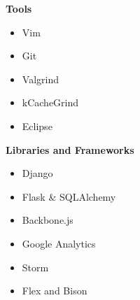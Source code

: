 \documentclass[overlapped]{res}
\begin{document}
\begin{resume}
\begin{multicols}{3}
        \textbf{Tools}
        \begin{itemize}
            \item Vim
            \item Git
            \item Valgrind
            \item kCacheGrind
            \item Eclipse
        \end{itemize}
        \columnbreak

        \textbf{Libraries and Frameworks}
        \begin{itemize}
            \item Django
            \item Flask \& SQLAlchemy
            \item Backbone.js
            \item Google Analytics
            \item Storm
            \item Flex and Bison
        \end{itemize}
    \end{multicols}


\end{resume}
\end{document}

